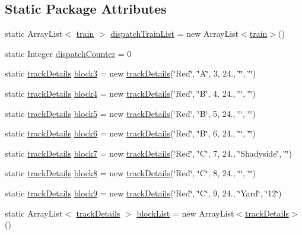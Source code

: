 \subsection*{Static Package Attributes}
\begin{DoxyCompactItemize}
\item 
static Array\+List$<$ \hyperlink{classtrain}{train} $>$ \hyperlink{classCTC__gui_ab5fa6fd520ef7d0ef6e08fa07699d208}{dispatch\+Train\+List} = new Array\+List$<$\hyperlink{classtrain}{train}$>$()
\item 
static Integer \hyperlink{classCTC__gui_ac03f22e602d0114ee24385cee260d39f}{dispatch\+Counter} = 0
\item 
static \hyperlink{classtrackDetails}{track\+Details} \hyperlink{classCTC__gui_ac0d6e738f3b1462abd7b962bd58d82ea}{block3} = new \hyperlink{classtrackDetails}{track\+Details}(\char`\"{}Red\char`\"{}, \char`\"{}A\char`\"{}, 3, 24., \char`\"{}\char`\"{}, \char`\"{}\char`\"{})
\item 
static \hyperlink{classtrackDetails}{track\+Details} \hyperlink{classCTC__gui_a15dab97be71f3b0198ec1e25f76408fe}{block4} = new \hyperlink{classtrackDetails}{track\+Details}(\char`\"{}Red\char`\"{}, \char`\"{}B\char`\"{}, 4, 24., \char`\"{}\char`\"{}, \char`\"{}\char`\"{})
\item 
static \hyperlink{classtrackDetails}{track\+Details} \hyperlink{classCTC__gui_a8a1217dd7fb5da4f4179f554d06854d4}{block5} = new \hyperlink{classtrackDetails}{track\+Details}(\char`\"{}Red\char`\"{}, \char`\"{}B\char`\"{}, 5, 24., \char`\"{}\char`\"{}, \char`\"{}\char`\"{})
\item 
static \hyperlink{classtrackDetails}{track\+Details} \hyperlink{classCTC__gui_a54becfe14761bd88f15a1757245422c6}{block6} = new \hyperlink{classtrackDetails}{track\+Details}(\char`\"{}Red\char`\"{}, \char`\"{}B\char`\"{}, 6, 24., \char`\"{}\char`\"{}, \char`\"{}\char`\"{})
\item 
static \hyperlink{classtrackDetails}{track\+Details} \hyperlink{classCTC__gui_a5b98f4aed52daa3a53ebb68a3930756e}{block7} = new \hyperlink{classtrackDetails}{track\+Details}(\char`\"{}Red\char`\"{}, \char`\"{}C\char`\"{}, 7, 24., \char`\"{}Shadyside\char`\"{}, \char`\"{}\char`\"{})
\item 
static \hyperlink{classtrackDetails}{track\+Details} \hyperlink{classCTC__gui_a2fbaa1b3920a22fb3180b607abb15d78}{block8} = new \hyperlink{classtrackDetails}{track\+Details}(\char`\"{}Red\char`\"{}, \char`\"{}C\char`\"{}, 8, 24., \char`\"{}\char`\"{}, \char`\"{}\char`\"{})
\item 
static \hyperlink{classtrackDetails}{track\+Details} \hyperlink{classCTC__gui_ad71b4889f6be57834e8dffb5a0e5ed37}{block9} = new \hyperlink{classtrackDetails}{track\+Details}(\char`\"{}Red\char`\"{}, \char`\"{}C\char`\"{}, 9, 24., \char`\"{}Yard\char`\"{}, \char`\"{}12\char`\"{})
\item 
static Array\+List$<$ \hyperlink{classtrackDetails}{track\+Details} $>$ \hyperlink{classCTC__gui_a64af0234646b1a791a6dd3b5e4a77950}{block\+List} = new Array\+List$<$\hyperlink{classtrackDetails}{track\+Details}$>$()
\end{DoxyCompactItemize}
